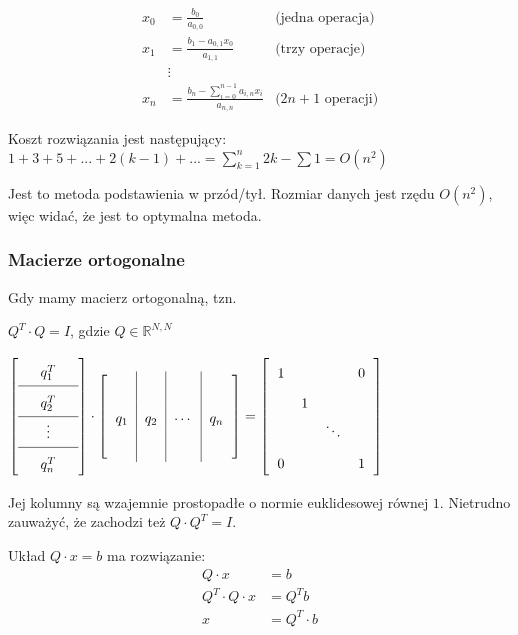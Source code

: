 \documentclass[hidelinks,a4paper,fleqn,oneside]{book}
\newcommand{\RR}{\mathbb{R}}
\newcommand{\eye}{I}
\begin{document}
\begin{align*}
	x_0 & = \frac{b_0}{a_{0,0}}                                & \text{(jedna operacja)}    \\
	x_1 & = \frac{b_1 - a_{0,1} x_0}{a_{1,1}}                  & \text{(trzy operacje)}     \\
	&\vdots \\
	x_n & = \frac{b_n - \sum_{i=0}^{n-1} a_{i,n} x_i}{a_{n,n}} & \text{($2n + 1$ operacji)} 
\end{align*}

Koszt rozwiązania jest następujący:
$1+3+5+...+2(k-1)+... = \sum_{k=1}^{n} 2k - \sum 1 = O(n^2)$

Jest to metoda podstawienia w przód/tył. Rozmiar danych jest rzędu $O(n^2)$, więc widać, że jest to optymalna metoda.

\subsubsection{Macierze ortogonalne}

Gdy mamy macierz ortogonalną, tzn.

$Q^T \cdot Q = I$, gdzie $Q \in \RR^{N, N}$

$\arraycolsep=0.6em\def\arraystretch{1.8}
\left[
	\begin{array}{c}
		\quad q_1^T \quad   \\ \hline
		\quad q_2^T \quad  \\ \hline
		\quad \vdots \quad \\ \hline
		\quad q_n^T \quad  
	\end{array}
\right]
\cdot
\left[
	\begin{array}{c|c|c|c}
		    &     &        &     \\
		q_1 & q_2 & \cdots & q_n \\
		    &     &        &     
	\end{array}
\right]
=
\left[
	\begin{array}{cccc}
		1 &   &        & 0 \\
		  & 1 &        &   \\
		  &   & \ddots &   \\
		0 &   &        & 1 
	\end{array}
\right]	
$

Jej kolumny są wzajemnie prostopadłe o normie euklidesowej równej $1$. Nietrudno zauważyć, że zachodzi też $Q \cdot Q^T = \eye$.

Układ $Q \cdot x = b$ ma rozwiązanie:
\begin{equation}
	\begin{aligned}
		Q \cdot x           & = b           \\
		Q^T \cdot Q \cdot x & = Q^T b       \\
		x                   & = Q^T \cdot b \\
	\end{aligned}
\end{equation}
\end{document}
